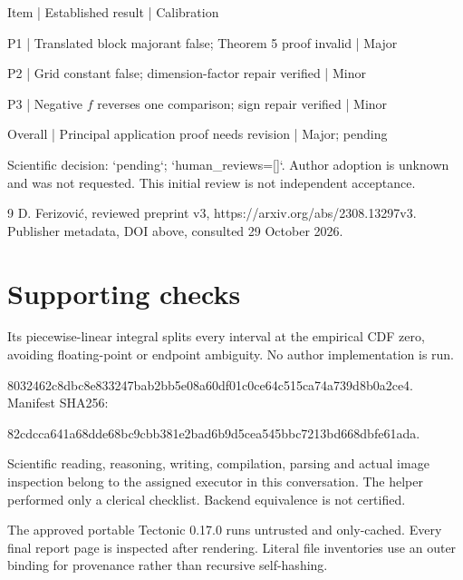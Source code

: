\documentclass[10pt]{article}
\begin{document}
Item | Established result | Calibration\par
P1 | Translated block majorant false; Theorem 5 proof invalid | Major\par
P2 | Grid constant false; dimension-factor repair verified | Minor\par
P3 | Negative \(f\) reverses one comparison; sign repair verified | Minor\par
Overall | Principal application proof needs revision | Major; pending\par
Scientific decision: `pending`; `human\_reviews=[]`. Author adoption is unknown and was not requested. This initial review is not independent acceptance.\par
9 D. Ferizović, reviewed preprint v3, https://arxiv.org/abs/2308.13297v3. Publisher metadata, DOI above, consulted 29 October 2026.\par
\section*{Supporting checks}
Its piecewise-linear integral splits every interval at the empirical CDF zero, avoiding floating-point or endpoint ambiguity. No author implementation is run.\par
8032462c8dbc8e833247bab2bb5e08a60df01c0ce64c515ca74a739d8b0a2ce4. Manifest SHA256:\par
82cdcca641a68dde68bc9cbb381e2bad6b9d5cea545bbc7213bd668dbfe61ada.\par
Scientific reading, reasoning, writing, compilation, parsing and actual image inspection belong to the assigned executor in this conversation. The helper performed only a clerical checklist. Backend equivalence is not certified.\par
The approved portable Tectonic 0.17.0 runs untrusted and only-cached. Every final report page is inspected after rendering. Literal file inventories use an outer binding for provenance rather than recursive self-hashing.\par
\end{document}
